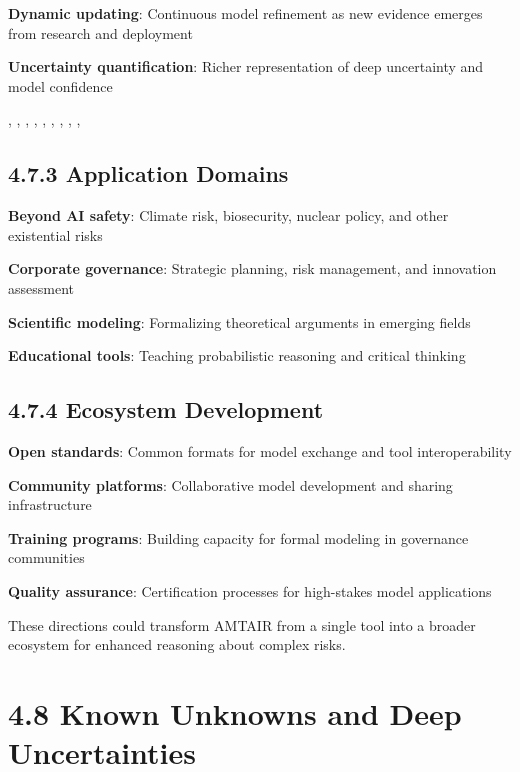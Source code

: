\documentclass[
  11pt,
  letterpaper,
]{book}
\begin{document}
\textbf{Dynamic updating}: Continuous model refinement as new evidence
emerges from research and deployment

\textbf{Uncertainty quantification}: Richer representation of deep
uncertainty and model confidence

\textcite{babakov2025}, \textcite{ban2023}, \textcite{bethard2007},
\textcite{chen2023}, \textcite{duhem1954}, \textcite{heinze-deml2018},
\textcite{meyer2022b}, \textcite{squires2023}, \textcite{squires2023},
\textcite{yang2022}

\subsection*{4.7.3 Application Domains}\label{sec-application-future}

\textbf{Beyond AI safety}: Climate risk, biosecurity, nuclear policy,
and other existential risks

\textbf{Corporate governance}: Strategic planning, risk management, and
innovation assessment

\textbf{Scientific modeling}: Formalizing theoretical arguments in
emerging fields

\textbf{Educational tools}: Teaching probabilistic reasoning and
critical thinking

\subsection*{4.7.4 Ecosystem Development}\label{sec-ecosystem-future}

\textbf{Open standards}: Common formats for model exchange and tool
interoperability

\textbf{Community platforms}: Collaborative model development and
sharing infrastructure

\textbf{Training programs}: Building capacity for formal modeling in
governance communities

\textbf{Quality assurance}: Certification processes for high-stakes
model applications

These directions could transform AMTAIR from a single tool into a
broader ecosystem for enhanced reasoning about complex risks.

\section*{4.8 Known Unknowns and Deep
Uncertainties}\label{sec-deep-uncertainties}
\end{document}
